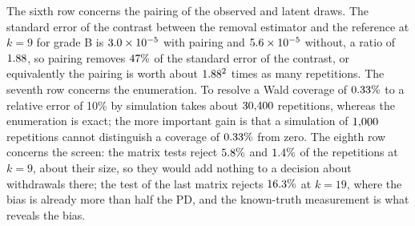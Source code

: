 The sixth row concerns the pairing of the observed and latent draws. The standard error of the contrast between the removal estimator and the reference at $k=9$ for grade B is $3.0\times10^{-5}$ with pairing and $5.6\times10^{-5}$ without, a ratio of $1.88$, so pairing removes $47\%$ of the standard error of the contrast, or equivalently the pairing is worth about $1.88^2$ times as many repetitions. The seventh row concerns the enumeration. To resolve a Wald coverage of $0.33\%$ to a relative error of 10\% by simulation takes about $30{,}400$ repetitions, whereas the enumeration is exact; the more important gain is that a simulation of $1{,}000$ repetitions cannot distinguish a coverage of $0.33\%$ from zero. The eighth row concerns the screen: the matrix tests reject $5.8\%$ and $1.4\%$ of the repetitions at $k=9$, about their size, so they would add nothing to a decision about withdrawals there; the test of the last matrix rejects $16.3\%$ at $k=19$, where the bias is already more than half the PD, and the known-truth measurement is what reveals the bias.
